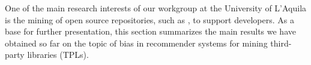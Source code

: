 

One of the main research interests of our workgroup at the University of L'Aquila is the mining of open source repositories, such as \GH, to support developers. %
As a base for further presentation, this section summarizes the main results we have obtained so far on the topic of bias in recommender systems for mining third-party libraries (TPLs). %









%
%








